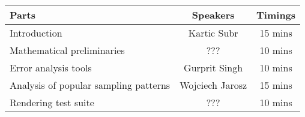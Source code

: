 %
%


\begin{center}
    \begin{tabular}{  | l | c | c |}
    \hline
    \rowcolor{LightCyan}
    Parts & Speakers & Timings \\
    \hline
    \rowcolor{LightPink1}
    Introduction & Kartic Subr   & 15 mins  \\ 
    \hline
    \rowcolor{Mint}
    Mathematical preliminaries   & ??? & 10 mins\\
    \hline
     \rowcolor{LightBlue}
    Error analysis tools & Gurprit Singh & 10 mins  \\	
    \hline
    \cellcolor{blue!25}Analysis of popular sampling patterns  & \cellcolor{blue!25}Wojciech Jarosz & \cellcolor{blue!25}15 mins \\
    \hline
    \rowcolor{Wheat}
    Rendering test suite & ??? & 10 mins  \\
    \hline
    \end{tabular}
\end{center}



